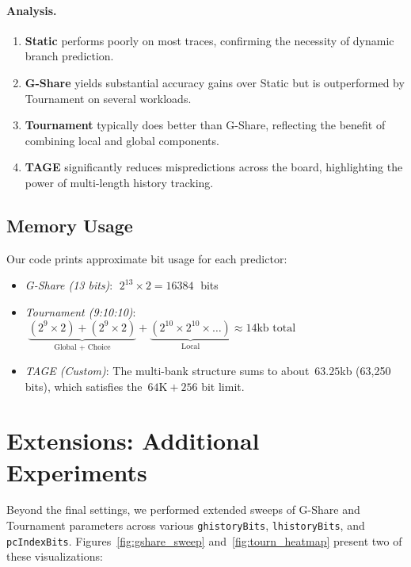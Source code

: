 \documentclass[11pt]{article}
\begin{document}
\paragraph{Analysis.}
\begin{enumerate}
    \item \textbf{Static} performs poorly on most traces, confirming the necessity of dynamic branch prediction.
    \item \textbf{G-Share} yields substantial accuracy gains over Static but is outperformed by Tournament on several workloads.
    \item \textbf{Tournament} typically does better than G-Share, reflecting the benefit of combining local and global components.
    \item \textbf{TAGE} significantly reduces mispredictions across the board, highlighting the power of multi-length history tracking.
\end{enumerate}

\subsection{Memory Usage}
Our code prints approximate bit usage for each predictor:
\begin{itemize}
    \item \emph{G-Share (13 bits)}: $\;2^{13} \times 2 = 16384\;$ bits
    \item \emph{Tournament (9:10:10)}: $\; \underbrace{(2^{9}\times 2) + (2^{9}\times 2)}_{\text{Global + Choice}} + \underbrace{(2^{10}\times 2^{10}\times \dots)}_{\text{Local}} \approx 14\text{kb total}$
    \item \emph{TAGE (Custom)}: The multi-bank structure sums to about \(\,63.25\)kb (63,250 bits), which satisfies the \(\,64\mathrm{K}+256\) bit limit.
\end{itemize}

\section{Extensions: Additional Experiments}

Beyond the final settings, we performed extended sweeps of G-Share and Tournament parameters across various \texttt{ghistoryBits}, \texttt{lhistoryBits}, and \texttt{pcIndexBits}. Figures~\ref{fig:gshare_sweep} and~\ref{fig:tourn_heatmap} present two of these visualizations:
\end{document}
